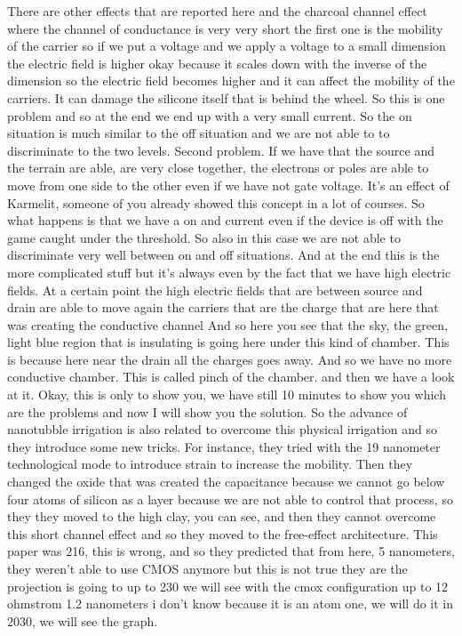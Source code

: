 There are other effects that are reported here and the charcoal channel effect where the channel of conductance is very very short the first one is the mobility of the carrier so if we put a voltage and we apply a voltage to a small dimension the electric field is higher okay because it scales down with the inverse of the dimension so the electric field becomes higher and it can affect the mobility of the carriers. It can damage the silicone itself that is behind the wheel. So this is one problem and so at the end we end up with a very small current. So the on situation is much similar to the off situation and we are not able to to discriminate to the two levels. Second problem. If we have that the source and the terrain are able, are very close together, the electrons or poles are able to move from one side to the other even if we have not gate voltage. It's an effect of Karmelit, someone of you already showed this concept in a lot of courses. So what happens is that we have a on and current even if the device is off with the game caught under the threshold. So also in this case we are not able to discriminate very well between on and off situations. And at the end this is the more complicated stuff but it's always even by the fact that we have high electric fields. At a certain point the high electric fields that are between source and drain are able to move again the carriers that are the charge that are here that was creating the conductive channel And so here you see that the sky, the green, light blue region that is insulating is going here under this kind of chamber. This is because here near the drain all the charges goes away. And so we have no more conductive chamber. This is called pinch of the chamber. and then we have a look at it. Okay, this is only to show you, we have still 10 minutes to show you which are the problems and now I will show you the solution.
So the advance of nanotubble irrigation is also related to overcome this physical irrigation and so they introduce some new tricks. For instance, they tried with the 19 nanometer technological mode to introduce strain to increase the mobility. Then they changed the oxide that was created the capacitance because we cannot go below four atoms of silicon as a layer because we are not able to control that process, so they they moved to the high clay, you can see, and then they cannot overcome this short channel effect and so they moved to the free-effect architecture. This paper was 216, this is wrong, and so they predicted that from here, 5 nanometers, they weren't able to use CMOS anymore but this is not true they are the projection is going to up to 230 we will see with the cmox configuration up to 12 ohmstrom 1.2 nanometers i don't know because it is an atom one, we will do it in 2030, we will see the graph.
